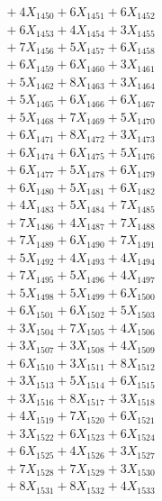 \documentclass[a4paper,10pt]{article}
\begin{document}
{\begin{align}
&\;  + 4 X_{1450} + 6 X_{1451} + 6 X_{1452} \\[0.3ex]
&\;  + 6 X_{1453} + 4 X_{1454} + 3 X_{1455} \\[0.3ex]
&\;  + 7 X_{1456} + 5 X_{1457} + 6 X_{1458} \\[0.3ex]
&\;  + 6 X_{1459} + 6 X_{1460} + 3 X_{1461} \\[0.3ex]
&\;  + 5 X_{1462} + 8 X_{1463} + 3 X_{1464} \\[0.3ex]
&\;  + 5 X_{1465} + 6 X_{1466} + 6 X_{1467} \\[0.3ex]
&\;  + 5 X_{1468} + 7 X_{1469} + 5 X_{1470} \\[0.3ex]
&\;  + 6 X_{1471} + 8 X_{1472} + 3 X_{1473} \\[0.3ex]
&\;  + 6 X_{1474} + 6 X_{1475} + 5 X_{1476} \\[0.3ex]
&\;  + 6 X_{1477} + 5 X_{1478} + 6 X_{1479} \\[0.5ex]\allowbreak
&\;  + 6 X_{1480} + 5 X_{1481} + 6 X_{1482} \\[0.3ex]
&\;  + 4 X_{1483} + 5 X_{1484} + 7 X_{1485} \\[0.3ex]
&\;  + 7 X_{1486} + 4 X_{1487} + 7 X_{1488} \\[0.3ex]
&\;  + 7 X_{1489} + 6 X_{1490} + 7 X_{1491} \\[0.3ex]
&\;  + 5 X_{1492} + 4 X_{1493} + 4 X_{1494} \\[0.3ex]
&\;  + 7 X_{1495} + 5 X_{1496} + 4 X_{1497} \\[0.3ex]
&\;  + 5 X_{1498} + 5 X_{1499} + 6 X_{1500} \\[0.3ex]
&\;  + 6 X_{1501} + 6 X_{1502} + 5 X_{1503} \\[0.3ex]
&\;  + 3 X_{1504} + 7 X_{1505} + 4 X_{1506} \\[0.3ex]
&\;  + 3 X_{1507} + 3 X_{1508} + 4 X_{1509} \\[0.5ex]\allowbreak
&\;  + 6 X_{1510} + 3 X_{1511} + 8 X_{1512} \\[0.3ex]
&\;  + 3 X_{1513} + 5 X_{1514} + 6 X_{1515} \\[0.3ex]
&\;  + 3 X_{1516} + 8 X_{1517} + 3 X_{1518} \\[0.3ex]
&\;  + 4 X_{1519} + 7 X_{1520} + 6 X_{1521} \\[0.3ex]
&\;  + 3 X_{1522} + 6 X_{1523} + 6 X_{1524} \\[0.3ex]
&\;  + 6 X_{1525} + 4 X_{1526} + 3 X_{1527} \\[0.3ex]
&\;  + 7 X_{1528} + 7 X_{1529} + 3 X_{1530} \\[0.3ex]
&\;  + 8 X_{1531} + 8 X_{1532} + 4 X_{1533} \\[0.3ex]

\end{align}}
\end{document}
